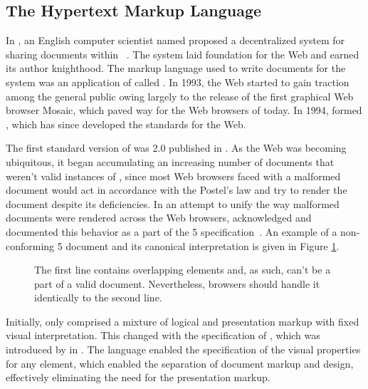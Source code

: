 \subsection{The Hypertext Markup Language}
In \citeyear{bernerslee89}, an English computer scientist named  proposed a decentralized system for sharing documents within
~\cite{bernerslee89}. The system laid foundation for the Web and
earned its author knighthood. The markup language used to write documents for
the system was an application of  called . In 1993,
the Web started to gain traction among the general public owing largely to the
release of the first graphical Web browser Mosaic, which paved way for the Web
browsers of today. In 1994,  formed
, which has since developed the standards for the Web.

The first standard version of  was  2.0
\cite{bernerslee95} published in \citeyear{bernerslee95}. As the Web was
becoming ubiquitous, it began accumulating an increasing number of documents
that weren't valid instances of , since most Web browsers faced
with a malformed document would act in accordance with the Postel's law%
and try to render the document despite its deficiencies. In an attempt to unify
the way malformed  documents were rendered across the Web
browsers,  acknowledged and documented this behavior as a part of
the 5 specification~\cite[sec.\,8.2]{hickson14}. An example of
a non-conforming 5 document and its canonical interpretation is
given in Figure \ref{fig:overlapping-elements}.

\begin{figure}[b]
  \caption{The first line contains overlapping elements and, as such, can't be a
    part of a valid  document. Nevertheless, browsers should
    handle it identically to the second line.}
  \label{fig:overlapping-elements}
\end{figure}

Initially,  only comprised a mixture of
logical and presentation markup
with fixed visual interpretation. This changed with the specification of
, which was introduced by  in \citeyear{lie96}. The
language enabled the specification of the visual properties for any
 element, which enabled the separation of document markup and
design, effectively eliminating the need for the presentation markup.


